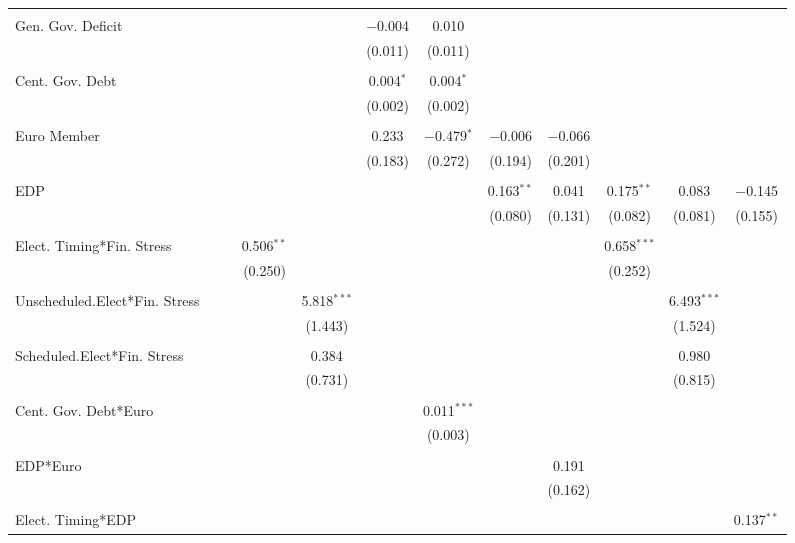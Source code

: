 \begin{table}[!htbp]
\begin{tabular}{@{\extracolsep{5pt}}lccccccccccc}
  & & & & & & & & & & & \\ 
 Gen. Gov. Deficit &  &  &  &  & $-$0.004 & 0.010 &  &  &  &  &  \\ 
  &  &  &  &  & (0.011) & (0.011) &  &  &  &  &  \\ 
  & & & & & & & & & & & \\ 
 Cent. Gov. Debt &  &  &  &  & 0.004$^{*}$ & 0.004$^{*}$ &  &  &  &  &  \\ 
  &  &  &  &  & (0.002) & (0.002) &  &  &  &  &  \\ 
  & & & & & & & & & & & \\ 
 Euro Member &  &  &  &  & 0.233 & $-$0.479$^{*}$ & $-$0.006 & $-$0.066 &  &  &  \\ 
  &  &  &  &  & (0.183) & (0.272) & (0.194) & (0.201) &  &  &  \\ 
  & & & & & & & & & & & \\ 
 EDP &  &  &  &  &  &  & 0.163$^{**}$ & 0.041 & 0.175$^{**}$ & 0.083 & $-$0.145 \\ 
  &  &  &  &  &  &  & (0.080) & (0.131) & (0.082) & (0.081) & (0.155) \\ 
  & & & & & & & & & & & \\ 
 Elect. Timing*Fin. Stress &  &  & 0.506$^{**}$ &  &  &  &  &  & 0.658$^{***}$ &  &  \\ 
  &  &  & (0.250) &  &  &  &  &  & (0.252) &  &  \\ 
  & & & & & & & & & & & \\ 
 Unscheduled.Elect*Fin. Stress &  &  &  & 5.818$^{***}$ &  &  &  &  &  & 6.493$^{***}$ &  \\ 
  &  &  &  & (1.443) &  &  &  &  &  & (1.524) &  \\ 
  & & & & & & & & & & & \\ 
 Scheduled.Elect*Fin. Stress &  &  &  & 0.384 &  &  &  &  &  & 0.980 &  \\ 
  &  &  &  & (0.731) &  &  &  &  &  & (0.815) &  \\ 
  & & & & & & & & & & & \\ 
 Cent. Gov. Debt*Euro &  &  &  &  &  & 0.011$^{***}$ &  &  &  &  &  \\ 
  &  &  &  &  &  & (0.003) &  &  &  &  &  \\ 
  & & & & & & & & & & & \\ 
 EDP*Euro &  &  &  &  &  &  &  & 0.191 &  &  &  \\ 
  &  &  &  &  &  &  &  & (0.162) &  &  &  \\ 
  & & & & & & & & & & & \\ 
 Elect. Timing*EDP &  &  &  &  &  &  &  &  &  &  & 0.137$^{**}$ \\ 

\end{tabular}
\end{table}

